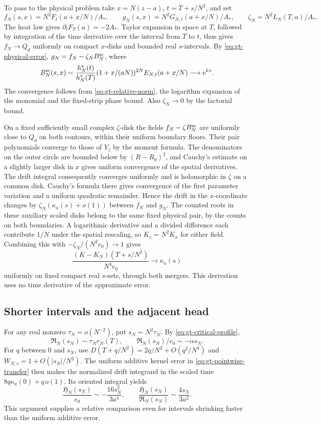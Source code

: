 To pass to the physical problem take \(x=N(z-a)\),
\(t=T+s/N^2\), and set
\[
 f_N(s,x)=N^2F_t(a+x/N)/A_* ,\qquad
 g_N(s,x)=N^2G_{N,t}(a+x/N)/A_* ,\qquad
 \zeta_N=N^2L_N(T,a)/A_*.
\]
The heat law gives \(\partial_tF_T(a)=-2A_*\).
Taylor expansion in space at \(T\), followed by integration of
the time derivative over the interval from \(T\) to \(t\), thus
gives \(f_N\to Q_d\) uniformly on compact \(x\)-disks and bounded
real \(s\)-intervals. By \eqref{eq:gt-physical-error},
\(g_N=f_N-\zeta_N B_N^{\rm sc}\), where
\[
 B_N^{\rm sc}(s,x)=
 \frac{h_N^*(t)}{h_N^*(T)}
       (1+x/(aN))^{2N}E_{N,t}(a+x/N)\longrightarrow\mathrm e^{kx}.
\]
The convergence follows from \eqref{eq:gt-relative-norm}, the
logarithm expansion of the monomial and the fixed-strip phase
bound. Also \(\zeta_N\to0\) by the factorial bound.

On a fixed sufficiently small complex \(\zeta\)-disk the
fields \(f_N-\zeta B_N^{\rm sc}\) are uniformly close to
\(Q_d\) on both contours, within their uniform boundary floors.
Their pair polynomials converge to those of \(Y_\zeta\) by the
moment formula. The denominators on the outer circle are bounded
below by \((R-R_0)^2\), and Cauchy's estimate on a slightly larger
disk in \(x\) gives uniform convergence of the spatial derivatives.
The drift integral consequently converges uniformly and is
holomorphic in \(\zeta\) on a common disk. Cauchy's formula there
gives convergence of the first parameter variation and a uniform
quadratic remainder. Hence the drift in the \(x\)-coordinate
changes by \(\zeta_N(\kappa_a(s)+o(1))\) between \(f_N\) and \(g_N\).
The counted roots in these auxiliary scaled disks belong to the
same fixed physical pair, by the counts on both boundaries.
A logarithmic derivative and a divided difference each contribute
\(1/N\) under the spatial rescaling, so \(K_z=N^2 K_x\) for
either field. Combining this with
\(-\zeta_N/(N^2e_0)\to1\) gives
\begin{equation}
 \frac{(K-K_N)(T+s/N^2)}{N^4e_0}\longrightarrow\kappa_a(s)
 \label{eq:gt-pointwise-transfer}
\end{equation}
uniformly on fixed compact real \(s\)-sets, through both mergers.
This derivation uses no time derivative of the approximate error.

\subsection{Shorter intervals and the adjacent head}

For any real nonzero \(\tau_N=o(N^{-2})\), put \(s_N=N^2\tau_N\).
By \eqref{eq:gt-critical-profile},
\[
 \mathfrak R_N(s_N)\sim\tau_N r_N(T),\qquad
 \mathfrak R_N(s_N)/e_0\sim-\alpha s_N .
\]
For \(q\) between \(0\) and \(s_N\), use
\(D(T+q/N^2)=2q/N^2+O(q^2/N^4)\) and
\(W_{N,v}=1+O(|s_N|/N^2)\).
The uniform additive kernel error in \eqref{eq:gt-pointwise-transfer}
then makes the normalized drift integrand in the scaled time
\(8q\kappa_a(0)+q\,o(1)\). Its oriented integral yields
\[
 \frac{\mathfrak H_N(s_N)}{e_0}\sim-\frac{16s_N^2}{3a^4},
 \qquad \frac{\mathfrak H_N(s_N)}{\mathfrak R_N(s_N)}
                  \sim\frac{4s_N}{3a^2}.
\]
This argument supplies a relative comparison even for intervals
shrinking faster than the uniform additive error.

